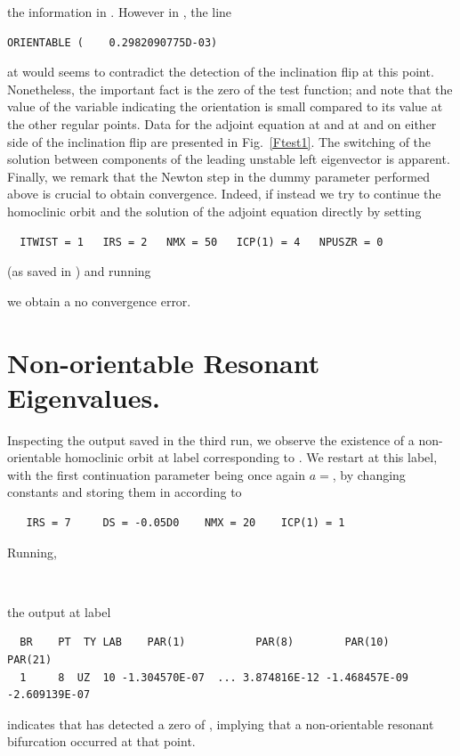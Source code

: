 \documentclass[12pt]{report}
\begin{document}
the information in .
However in , the line 
\begin{verbatim} 
ORIENTABLE (    0.2982090775D-03)
\end{verbatim}
at  would seems to contradict the 
detection of the inclination flip at this point. Nonetheless, the
important fact is the zero of the test function; and note that 
the value of the variable indicating the orientation is 
small compared to its value at the other regular points. 
Data for the adjoint equation at  and  at
and on either side of the inclination flip are presented in 
Fig.\ \ref{Ftest1}. The switching of the solution between components
of the leading unstable left eigenvector is apparent.
Finally, we remark that the Newton step in the dummy 
parameter  performed above is crucial
to obtain convergence. Indeed, if instead we try to continue the
homoclinic orbit and the solution of the adjoint equation directly by
setting
\begin{verbatim}
  ITWIST = 1   IRS = 2   NMX = 50   ICP(1) = 4   NPUSZR = 0
\end{verbatim}
(as saved in ) and running
\begin{center}
\end{center}
we obtain a no convergence error.

\section{Non-orientable Resonant Eigenvalues.}
Inspecting the output saved in the third run,
we observe the existence of a non-orientable homoclinic orbit at label 
 corresponding to . We restart at this label, with
the first continuation parameter being once again $a=$, 
by changing constants and storing them in  according to 
\begin{verbatim}
   IRS = 7     DS = -0.05D0    NMX = 20    ICP(1) = 1
\end{verbatim}
Running, 
 \begin{center}
\\
\end{center}
the output at label 
\begin{verbatim}
  BR    PT  TY LAB    PAR(1)           PAR(8)        PAR(10)       PAR(21)       
  1     8  UZ  10 -1.304570E-07  ... 3.874816E-12 -1.468457E-09 -2.609139E-07 
\end{verbatim}
indicates that \AUTO has detected a zero of
, implying that a non-orientable resonant bifurcation occurred at that
point.
\end{document}
